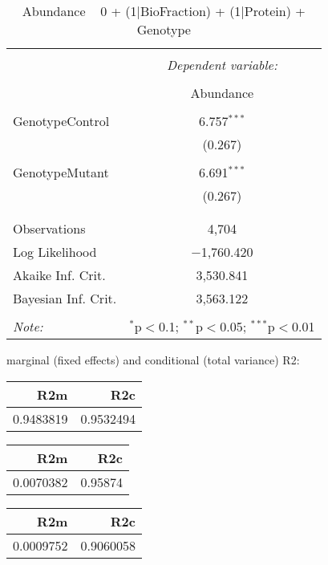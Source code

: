 \documentclass[11pt]{report}
\begin{document}
\begin{table}[!htbp] \centering 
  \caption{Abundance ~ 0 + (1|BioFraction) + (1|Protein) + Genotype} 
  \label{} 
\begin{tabular}{@{\extracolsep{5pt}}lc} 
\\[-1.8ex]\hline 
\hline \\[-1.8ex] 
 & \multicolumn{1}{c}{\textit{Dependent variable:}} \\ 
\cline{2-2} 
\\[-1.8ex] & Abundance \\ 
\hline \\[-1.8ex] 
 GenotypeControl & 6.757$^{***}$ \\ 
  & (0.267) \\ 
  & \\ 
 GenotypeMutant & 6.691$^{***}$ \\ 
  & (0.267) \\ 
  & \\ 
\hline \\[-1.8ex] 
Observations & 4,704 \\ 
Log Likelihood & $-$1,760.420 \\ 
Akaike Inf. Crit. & 3,530.841 \\ 
Bayesian Inf. Crit. & 3,563.122 \\ 
\hline 
\hline \\[-1.8ex] 
\textit{Note:}  & \multicolumn{1}{r}{$^{*}$p$<$0.1; $^{**}$p$<$0.05; $^{***}$p$<$0.01} \\ 
\end{tabular} 
\end{table} 
marginal (fixed effects) and conditional (total variance) R2:

\begin{tabular}{r|r}
\hline
R2m & R2c\\
\hline
0.9483819 & 0.9532494\\
\hline
\end{tabular}

\begin{tabular}{r|r}
\hline
R2m & R2c\\
\hline
0.0070382 & 0.95874\\
\hline
\end{tabular}

\begin{tabular}{r|r}
\hline
R2m & R2c\\
\hline
0.0009752 & 0.9060058\\
\hline
\end{tabular}
\end{document}
